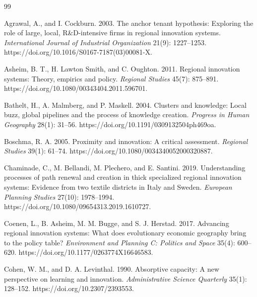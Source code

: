 \begin{thebibliography}{99}
\providecommand{\natexlab}[1]{#1}
\providecommand{\url}[1]{\texttt{#1}}
\providecommand{\doi}[1]{https://doi.org/#1}

Agrawal, A., and I. Cockburn. 2003. The anchor tenant hypothesis: Exploring the role of large, local, R\&D-intensive firms in regional innovation systems. \emph{International Journal of Industrial Organization} 21(9): 1227--1253. \doi{10.1016/S0167-7187(03)00081-X}.

Asheim, B. T., H. Lawton Smith, and C. Oughton. 2011. Regional innovation systems: Theory, empirics and policy. \emph{Regional Studies} 45(7): 875--891. \doi{10.1080/00343404.2011.596701}.

Bathelt, H., A. Malmberg, and P. Maskell. 2004. Clusters and knowledge: Local buzz, global pipelines and the process of knowledge creation. \emph{Progress in Human Geography} 28(1): 31--56. \doi{10.1191/0309132504ph469oa}.

Boschma, R. A. 2005. Proximity and innovation: A critical assessment. \emph{Regional Studies} 39(1): 61--74. \doi{10.1080/0034340052000320887}.

Chaminade, C., M. Bellandi, M. Plechero, and E. Santini. 2019. Understanding processes of path renewal and creation in thick specialized regional innovation systems: Evidence from two textile districts in Italy and Sweden. \emph{European Planning Studies} 27(10): 1978--1994. \doi{10.1080/09654313.2019.1610727}.

Coenen, L., B. Asheim, M. M. Bugge, and S. J. Herstad. 2017. Advancing regional innovation systems: What does evolutionary economic geography bring to the policy table? \emph{Environment and Planning C: Politics and Space} 35(4): 600--620. \doi{10.1177/0263774X16646583}.

Cohen, W. M., and D. A. Levinthal. 1990. Absorptive capacity: A new perspective on learning and innovation. \emph{Administrative Science Quarterly} 35(1): 128--152. \doi{10.2307/2393553}.


\end{thebibliography}
